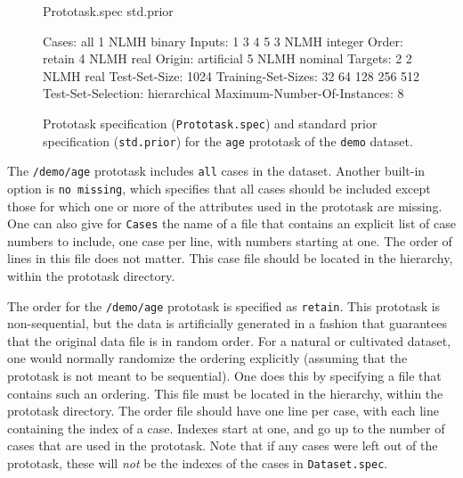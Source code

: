 \begin{figure}[t]
\begin{Session}
        Prototask.spec                                std.prior

Cases: all                                         1 NLMH binary
Inputs: 1 3 4 5                                    3 NLMH integer
Order: retain                                      4 NLMH real
Origin: artificial                                 5 NLMH nominal
Targets: 2                                         2 NLMH real
Test-Set-Size: 1024                        
Training-Set-Sizes: 32 64 128 256 512      
Test-Set-Selection: hierarchical           
Maximum-Number-Of-Instances: 8             
\end{Session}\vspace{-4pt}
\caption{Prototask specification (\texttt{Prototask.spec}) and standard 
         prior specification (\texttt{std.prior}) for the \texttt{age} 
         prototask of the \texttt{demo} dataset.}
\label{fig:task-spec}
\end{figure}

The \texttt{/demo/age} prototask includes \texttt{all} cases in the
dataset.  Another built-in option is \mbox{\texttt{no missing}}, which
specifies that all cases should be included except those for which one
or more of the attributes used in the prototask are missing.  One can
also give for \texttt{Cases} the name of a file that contains an explicit
list of case numbers to include, one case per line, with numbers
starting at one.  The order of lines in this file does not matter.
This case file should be located in the \delve{} hierarchy, within the
prototask directory.

The order for the \texttt{/demo/age} prototask is specified as
\texttt{retain}.  This prototask is non-sequential, but the data is
artificially generated in a fashion that guarantees that the original
data file is in random order.  For a natural or cultivated dataset,
one would normally randomize the ordering explicitly (assuming that
the prototask is not meant to be sequential).  One does this by
specifying a file that contains such an ordering.  This file must be
located in the \delve{} hierarchy, within the prototask directory.
The order file should have one line per case, with each line
containing the index of a case.  Indexes start at one, and go up to
the number of cases that are used in the prototask.  Note that if any
cases were left out of the prototask, these will \emph{not} be the
indexes of the cases in \texttt{Dataset.spec}.

